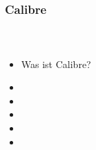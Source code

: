 \documentclass[12pt,ngerman]{beamer}
\begin{document}
\begin{frame}
\frametitle{Calibre}
\framesubtitle{~}

\begin{itemize}
\item Was ist Calibre?
\item 
\item 
\item 
\item 
\item 
\end{itemize}
\end{frame}
\end{document}
